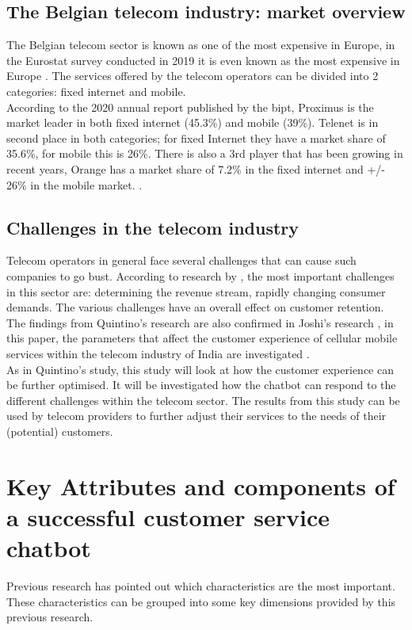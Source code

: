 \subsection{The Belgian telecom industry: market overview}
The Belgian telecom sector is known as one of the most expensive in Europe, in the Eurostat survey conducted in 2019 it is even known as the most expensive in Europe \citep{Eurostat2020}. The services offered by the telecom operators can be divided into 2 categories: fixed internet and mobile.\\
\break
According to the 2020 annual report published by the \acrfull{bipt}, Proximus is the market leader in both fixed internet (45.3\%) and mobile (39\%). Telenet is in second place in both categories; for fixed Internet they have a market share of 35.6\%, for mobile this is 26\%. There is also a 3rd player that has been growing in recent years, Orange has a market share of 7.2\% in the fixed internet and +/- 26\% in the mobile market. \citep*{BIPT2021,VanLeemputten2021}.\\

\subsection{Challenges in the telecom industry}
Telecom operators in general face several challenges that can cause such companies to go bust. According to research by \citeauthor{Quintino2019} \citep*{Quintino2019, Malviya2012}, the most important challenges in this sector are: determining the revenue stream, rapidly changing consumer demands. The various challenges have an overall effect on customer retention. The findings from Quintino's research are also confirmed in Joshi's research \citep{Joshi2014}, in this paper, the parameters that affect the customer experience of cellular mobile services within the telecom industry of India are investigated \citep*{Joshi2014, Quintino2019, Malviya2012}.\\
\break
As in Quintino's study, this study will look at how the customer experience can be further optimised. It will be investigated how the chatbot can respond to the different challenges within the telecom sector. The results from this study can be used by telecom providers to further adjust their services to the needs of their (potential) customers.

\section{Key Attributes and components of a successful customer service chatbot}
Previous research \citep*{Muizzah2021, Verkeyn2018} has pointed out which characteristics are the most important. These characteristics can be grouped into some key dimensions provided by this previous research.\\


